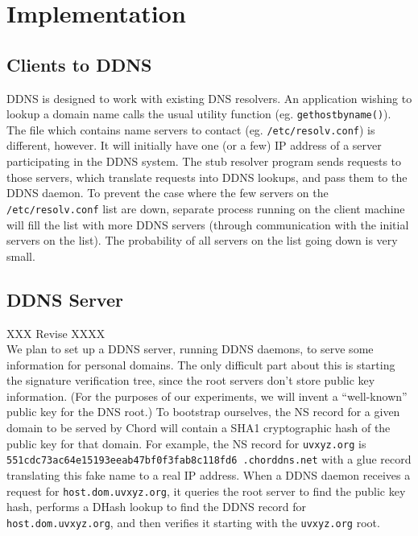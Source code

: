 \section{Implementation}

\subsection{Clients to DDNS}

DDNS is designed to work with existing DNS resolvers. 
An application wishing to lookup a domain name calls
the usual utility function (eg. {\tt gethostbyname()}). 
The file which contains name servers to contact 
(eg. {\tt /etc/resolv.conf}) is different, however.
It will initially have one (or a few) IP address of
a server participating in the DDNS system. The stub 
resolver program sends requests to those servers,
which translate requests into DDNS lookups,
and pass them to the DDNS daemon.
To prevent the case where the few servers on the 
{\tt /etc/resolv.conf} list are down, separate process 
running on the client machine will fill the list with
more DDNS servers (through communication with the initial
servers on the list). The probability of all servers
on the list going down is very small.

\subsection{DDNS Server}

XXX Revise XXXX\\
We plan to set up a DDNS server, running DDNS daemons,
to serve some information for personal domains.
The only difficult part about this is starting the signature
verification tree, since the root servers don't store public
key information. (For the purposes of our experiments,
we will invent a ``well-known'' public key for the DNS root.)
To bootstrap ourselves,
the NS record for a given domain to be served
by Chord will contain a SHA1 cryptographic hash of the
public key for that domain.
For example, the NS record for {\tt uvxyz.org}
is {\tt 551cdc73ac64e15193eeab47bf0f3fab8c118fd6
.chorddns.net}
with a glue record translating this fake name to a real IP address.
When a DDNS daemon receives a request for {\tt host.dom.uvxyz.org},
it queries the root server to find the public key hash,
performs a DHash lookup to find the DDNS record for {\tt host.dom.uvxyz.org},
and then verifies it starting with the {\tt uvxyz.org} root.

